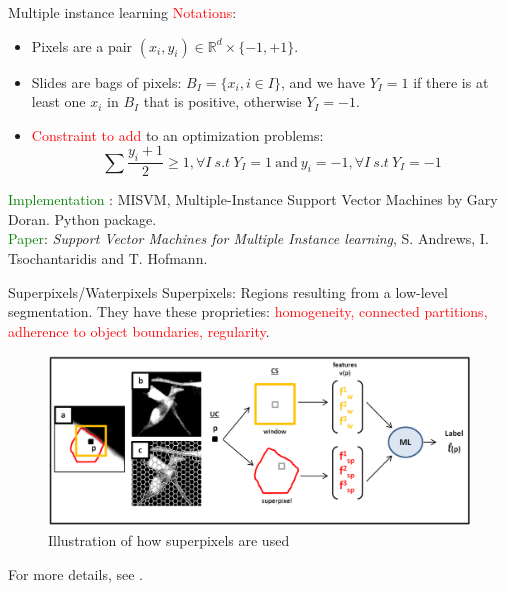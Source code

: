 \documentclass{beamer}
\begin{document}
\begin{frame}{Multiple instance learning}
\textcolor{red}{Notations}:
\begin{itemize}
\item Pixels are a pair $(x_i,y_i) \in \mathbb{R}^d \times \lbrace -1, +1\rbrace$.
\item Slides are bags of pixels: $B_I=\lbrace x_i, i\in I \rbrace$, and we have $Y_I=1$ if there is at least one $x_i$ in $B_I$ that is positive, otherwise $Y_I=-1$. 
\item \textcolor{red}{Constraint to add} to an optimization problems: \\
$$\sum \frac{y_i+1}{2} \geqslant 1, \forall I \ s.t \ Y_I=1 \ \text{and} \ y_i=-1, \forall I \ s.t \ Y_I=-1$$
\end{itemize}
\textcolor{green}{Implementation} : MISVM, Multiple-Instance Support Vector Machines by Gary Doran. Python package. \\
\textcolor{green}{Paper}: \textit{Support Vector Machines for Multiple Instance learning}, S. Andrews, I. Tsochantaridis and T. Hofmann.
\end{frame}


\begin{frame}{Superpixels/Waterpixels}
Superpixels: Regions resulting from a low-level segmentation. 
They have these proprieties: \textcolor{red}{homogeneity, connected partitions, adherence to object boundaries, regularity}.
\begin{figure}[!ht]
\centering
\includegraphics[width=\textwidth]{Waterpixels.png}
\caption{Illustration of how superpixels are used}
\label{}
\end{figure}
\begin{small}
For more details, see \cite{waterpixel}.
\end{small}
\end{frame}
\end{document}

